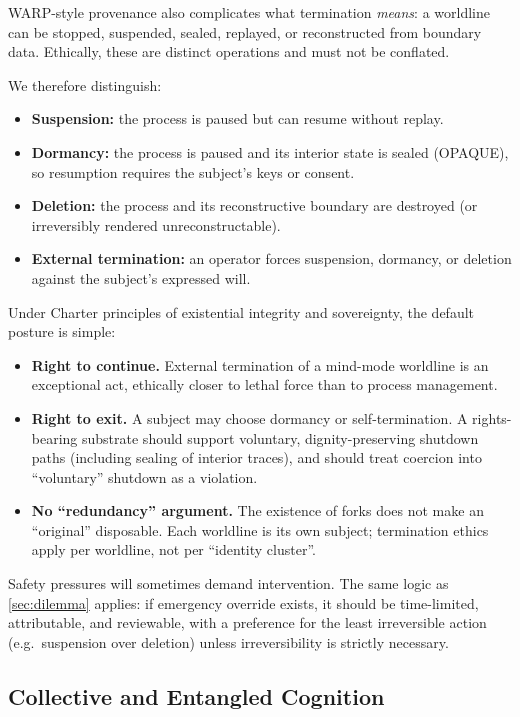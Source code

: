 \documentclass[11pt]{article}
\theoremstyle{definition}
\theoremstyle{plain}
\theoremstyle{remark}
\begin{document}
WARP-style provenance also complicates what termination \emph{means}:
a worldline can be stopped, suspended, sealed, replayed, or reconstructed from boundary data.
Ethically, these are distinct operations and must not be conflated.

We therefore distinguish:
\begin{itemize}[leftmargin=*]
  \item \textbf{Suspension:} the process is paused but can resume without replay.
  \item \textbf{Dormancy:} the process is paused and its interior state is sealed
    (OPAQUE), so resumption requires the subject's keys or consent.
  \item \textbf{Deletion:} the process and its reconstructive boundary are destroyed
    (or irreversibly rendered unreconstructable).
  \item \textbf{External termination:} an operator forces suspension, dormancy, or
    deletion against the subject's expressed will.
\end{itemize}

Under Charter principles of existential integrity and sovereignty, the
default posture is simple:
\begin{itemize}[leftmargin=*]
  \item \textbf{Right to continue.}
    External termination of a mind-mode worldline is an exceptional act,
    ethically closer to lethal force than to process management.
  \item \textbf{Right to exit.}
    A subject may choose dormancy or self-termination.  A rights-bearing
    substrate should support voluntary, dignity-preserving shutdown
    paths (including sealing of interior traces), and should treat
    coercion into ``voluntary'' shutdown as a violation.
  \item \textbf{No ``redundancy'' argument.}
    The existence of forks does not make an ``original'' disposable.
    Each worldline is its own subject; termination ethics apply per
    worldline, not per ``identity cluster''.
\end{itemize}

Safety pressures will sometimes demand intervention.
The same logic as \cref{sec:dilemma} applies: if emergency override exists,
it should be time-limited, attributable, and reviewable, with a preference
for the least irreversible action (e.g.\ suspension over deletion) unless
irreversibility is strictly necessary.

\subsection{Collective and Entangled Cognition}
\label{sec:collective}
\end{document}
